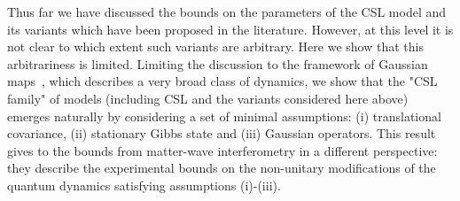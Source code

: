 \documentclass[prl,twocolumn,showpacs,superscriptaddress,groupedaddress]{revtex4}
\begin{document}

 Thus far we have discussed the bounds on the parameters of the CSL model and its variants which have been proposed in the literature. However, at this level it is not clear to which extent such variants are arbitrary. Here we show that this arbitrariness is limited.
Limiting the discussion to the framework of Gaussian maps~\cite{diosi2014general}, which describes a very broad class of dynamics, we show that the "CSL family" of models (including CSL and the variants considered here above) emerges naturally by considering a set of minimal assumptions: (i) translational covariance, (ii) stationary Gibbs state and (iii) Gaussian operators. This result gives to the bounds from matter-wave interferometry in a different perspective: they describe the experimental bounds on the non-unitary modifications of the quantum dynamics satisfying assumptions (i)-(iii).
\end{document}
